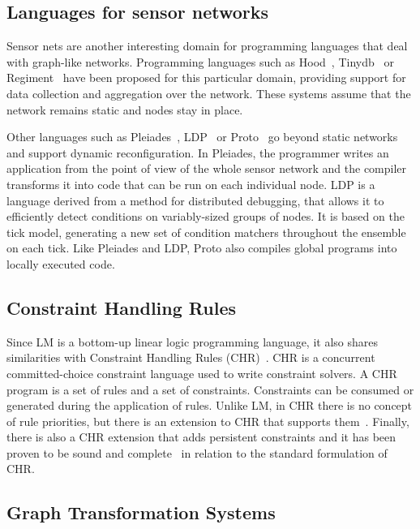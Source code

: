 \subsection{Languages for sensor networks}

Sensor nets are another interesting domain for programming languages that deal
with graph-like networks.  Programming languages such as
Hood~\cite{Whitehouse:2004:HNA:990064.990079},
Tinydb~\cite{Madden:2005:TAQ:1061318.1061322} or
Regiment~\cite{Newton:2007:RMS:1236360.1236422} have been proposed for this
particular domain, providing support for data collection and aggregation over
the network.  These systems assume that the network remains static and nodes
stay in place.

Other languages such as Pleiades~\cite{Kothari:2007:REP:1250734.1250757},
LDP~\cite{4543691} or Proto~\cite{Beal:2006:IEE:1137236.1137354} go beyond
static networks and support dynamic reconfiguration. In Pleiades, the
programmer writes an application from the point of view of the whole
sensor network and the compiler transforms it into code that can be run on
each individual node.  LDP is a language derived from a method for
distributed debugging, that allows it to efficiently detect conditions on
variably-sized groups of nodes. It is based on the tick model, generating
a new set of condition matchers throughout the ensemble on each tick.
Like Pleiades and LDP, Proto also compiles global programs into locally
executed code.

\subsection{Constraint Handling Rules}

Since LM is a bottom-up linear logic programming language, it also shares
similarities with Constraint Handling Rules
(CHR)~\cite{Betz:2005kx,Betz:2013:LBA:2422085.2422086}.  CHR is a concurrent
committed-choice constraint language used to write constraint solvers. A CHR
program is a set of rules and a set of constraints. Constraints can be consumed
or generated during the application of rules. Unlike LM, in CHR there is no
concept of rule priorities, but there is an extension to CHR that supports
them~\cite{DeKoninck:2007:URP:1273920.1273924}.  Finally, there is also a CHR
extension that adds persistent constraints and it has been proven to be sound
and complete~\cite{DBLP:journals/corr/abs-1007-3829} in relation to the standard
formulation of CHR.

\subsection{Graph Transformation Systems}

